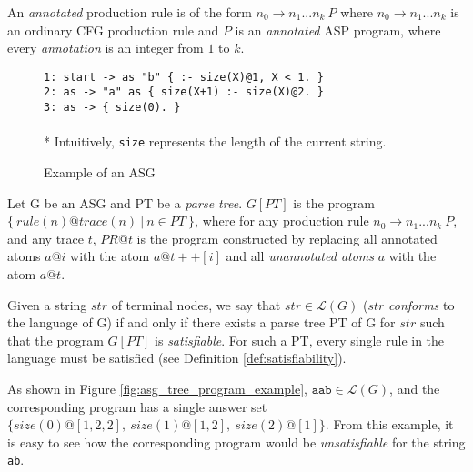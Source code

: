 \begin{definition}
 An \textit{annotated} production rule is of the form $n_0 \to n_1 ... n_k\ P$ where $n_0 \to n_1 ... n_k$ is an ordinary CFG production rule and $P$ is an \textit{annotated} ASP program, where every \textit{annotation} is an integer from $1$ to $k$.
\end{definition}

\begin{figure}[H]
\texttt{1: start -> as "b" \{ :- size(X)@1, X < 1. \} \\
           2: as -> "a" as \space\space\space\{ size(X+1) :- size(X)@2. \} \\
           3: as -> \space\space\space\space\space\space\space\space\space\space\{ size(0). \} \\}\\
* Intuitively, \texttt{size} represents the length of the current string.
\caption{Example of an ASG}
\label{fig:asg_example}
\end{figure}

\begin{definition}
Let G be an ASG and PT be a \textit{parse tree}. $G[PT]$ is the program $\{\ rule(n)@trace(n)\ |\ n \in PT\ \}$, where for any production rule $n_0 \to n_1...n_k\ P$, and any trace $t$, $PR@t$ is the program constructed by replacing all annotated atoms $a@i$ with the atom $a@t++[i]$ and all \textit{unannotated atoms} $a$ with the atom $a@t$.
\end{definition}

\begin{definition}
Given a string $str$ of terminal nodes, we say that $str \in \mathcal{L}(G)$ ($str$ \textit{conforms} to the language of G) if and only if there exists a parse tree PT of G for $str$ such that the program $G[PT]$ is \textit{satisfiable}. For such a PT, every single rule in the language must be satisfied (see Definition \ref{def:satisfiability}).
\end{definition}

As shown in Figure \ref{fig:asg_tree_program_example}, $\texttt{aab} \in \mathcal{L}(G)$, and the corresponding program has a single answer set $\{size(0)@[1,2,2],\ size(1)@[1,2],\ size(2)@[1]\}$. From this example, it is easy to see how the corresponding program would be \textit{unsatisfiable} for the string \texttt{ab}.

